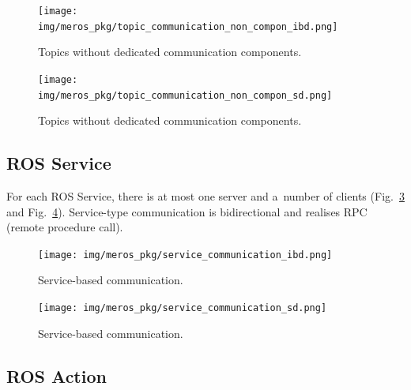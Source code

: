\documentclass[11pt,oneside,a4paper]{report}
\begin{document}
	
	\begin{figure}[H]
		\centering
		\begin{center}
			{\texttt{[image: img/meros\_pkg/topic\_communication\_non\_compon\_ibd.png]}}
		\end{center}
		\caption{Topics without dedicated communication components.} 
		\label{fig:topic_communication_without_dedicated_component_ibd}
	\end{figure}
	
	\begin{figure}[H]
		\centering
		\begin{center}
			{\texttt{[image: img/meros\_pkg/topic\_communication\_non\_compon\_sd.png]}}
		\end{center}
		\caption{Topics without dedicated communication components.} 
		\label{fig:topic_communication_without_dedicated_component_sd}
	\end{figure}
	
	
	\pagebreak
	
	
\subsection{ROS Service}
\label{ch:metamodel-service}
	
	For each ROS Service, there is at most one server and a~number of clients (Fig.~\ref{fig:service_communication_ibd} and Fig.~\ref{fig:service_communication_sd}). Service-type communication is bidirectional and realises RPC (remote procedure call).
	

	\begin{figure}[H]
		\centering
		\begin{center}
			{\texttt{[image: img/meros\_pkg/service\_communication\_ibd.png]}}
		\end{center}
		\caption{Service-based communication.} 
		\label{fig:service_communication_ibd}
	\end{figure}
	

	\begin{figure}[H]
		\centering
		\begin{center}
			{\texttt{[image: img/meros\_pkg/service\_communication\_sd.png]}}
		\end{center}
		\caption{Service-based communication.} 
		\label{fig:service_communication_sd}
	\end{figure}
	
	
\subsection{ROS Action}
\label{ch:metamodel-action}
	
\end{document}
